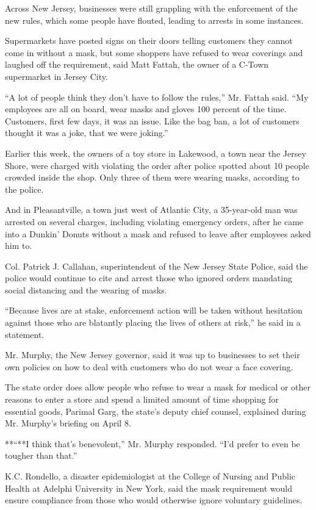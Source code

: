 Across New Jersey, businesses were still grappling with the enforcement
of the new rules, which some people have flouted, leading to arrests in
some instances.

Supermarkets have posted signs on their doors telling customers they
cannot come in without a mask, but some shoppers have refused to wear
coverings and laughed off the requirement, said Matt Fattah, the owner
of a C-Town supermarket in Jersey City.

``A lot of people think they don't have to follow the rules,'' Mr.
Fattah said. ``My employees are all on board, wear masks and gloves 100
percent of the time. Customers, first few days, it was an issue. Like
the bag ban, a lot of customers thought it was a joke, that we were
joking.''

Earlier this week, the owners of a toy store in Lakewood, a town near
the Jersey Shore, were charged with violating the order after police
spotted about 10 people crowded inside the shop. Only three of them were
wearing masks, according to the police.

And in Pleasantville, a town just west of Atlantic City, a 35-year-old
man was arrested on several charges, including violating emergency
orders, after he came into a Dunkin' Donuts without a mask and refused
to leave after employees asked him to.

Col. Patrick J. Callahan, superintendent of the New Jersey State Police,
said the police would continue to cite and arrest those who ignored
orders mandating social distancing and the wearing of masks.

``Because lives are at stake, enforcement action will be taken without
hesitation against those who are blatantly placing the lives of others
at risk,'' he said in a statement.

Mr. Murphy, the New Jersey governor, said it was up to businesses to set
their own policies on how to deal with customers who do not wear a face
covering.

The state order does allow people who refuse to wear a mask for medical
or other reasons to enter a store and spend a limited amount of time
shopping for essential goods, Parimal Garg, the state's deputy chief
counsel, explained during Mr. Murphy's briefing on April 8.

**``**I think that's benevolent,'' Mr. Murphy responded. ``I'd prefer to
even be tougher than that.''

K.C. Rondello, a disaster epidemiologist at the College of Nursing and
Public Health at Adelphi University in New York, said the mask
requirement would ensure compliance from those who would otherwise
ignore voluntary guidelines.


